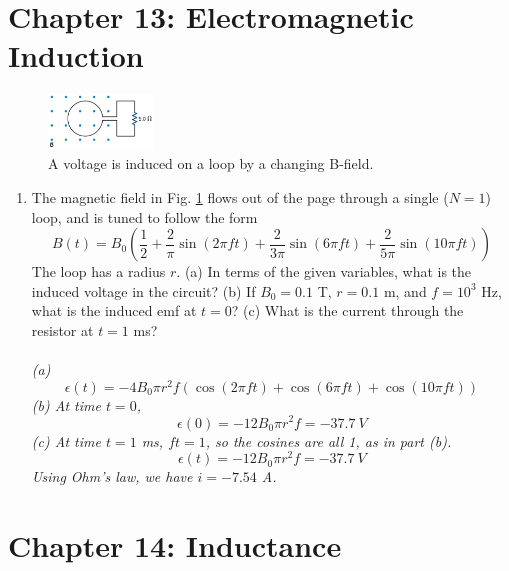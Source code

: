 \documentclass[10pt]{article}
\begin{document}
\section{Chapter 13: Electromagnetic Induction}

\begin{figure}[hb]
\centering
\includegraphics[width=0.25\textwidth]{loopsine.png}
\caption{\label{fig:chap13_1} A voltage is induced on a loop by a changing B-field.}
\end{figure}

\begin{enumerate}
\item The magnetic field in Fig. \ref{fig:chap13_1} flows out of the page through a single ($N=1$) loop, and is tuned to follow the form
\begin{equation}
B(t) = B_0\left( \frac{1}{2} + \frac{2}{\pi}\sin(2\pi f t) + \frac{2}{3\pi}\sin(6\pi f t) + \frac{2}{5\pi}\sin(10\pi f t) \right)
\end{equation}
The loop has a radius $r$.  (a) In terms of the given variables, what is the induced voltage in the circuit? (b) If $B_0 = 0.1$ T, $r = 0.1$ m, and $f = 10^3$ Hz, what is the induced emf at $t=0$?  (c) What is the current through the resistor at $t=1$ ms? \\ \\
\textit{(a) 
\begin{equation}
\epsilon(t) = -4 B_0 \pi r^2 f \left( \cos(2\pi ft) + \cos(6\pi ft) + \cos(10\pi ft) \right)
\end{equation}
(b) At time $t=0$,
\begin{equation}
\epsilon(0) = -12 B_0 \pi r^2 f = -37.7~V
\end{equation}
(c) At time $t=1$ ms, $ft = 1$, so the cosines are all 1, as in part (b).
\begin{equation}
\epsilon(t) = -12 B_0 \pi r^2 f = -37.7~V
\end{equation}
Using Ohm's law, we have $i = -7.54$ A.
}
\end{enumerate}

\section{Chapter 14: Inductance}
\end{document}
